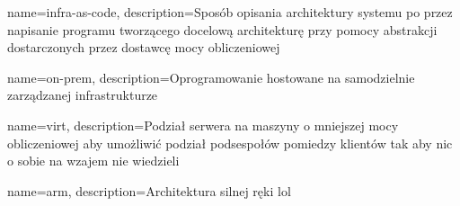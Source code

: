 {
    name={infra-as-code},
    description={Sposób opisania architektury systemu po przez napisanie programu tworzącego docelową architekturę przy pomocy abstrakcji dostarczonych przez dostawcę mocy obliczeniowej}
}

{
    name={on-prem},
    description={Oprogramowanie hostowane na samodzielnie zarządzanej infrastrukturze}
}

{
    name={virt},
    description={Podział serwera na maszyny o mniejszej mocy obliczeniowej aby umożliwić podział podsespołów pomiedzy klientów tak aby nic o sobie na wzajem nie wiedzieli}
}

{
    name={arm},
    description={Architektura silnej ręki lol}
}
